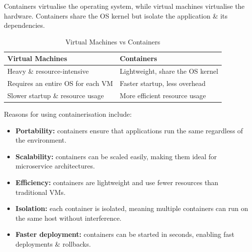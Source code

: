 \documentclass[a4paper,11pt]{article}
\begin{document}
Containers virtualise the operating system, while virtual machines virtualise the hardware.
Containers share the OS kernel but isolate the application \& its dependencies.

\begin{table}[h!]
    \centering

    \begin{tabular}{|>{\arraybackslash}p{}|>{\arraybackslash}p{}|}
        \hline
        \textbf{Virtual Machines}                                           & \textbf{Containers} \\
        \hline
        Heavy \& resource-intensive                                         & Lightweight, share the OS kernel \\
        \hline
        Requires an entire OS for each VM                                   & Faster startup, less overhead \\
        \hline
        Slower startup \& resource usage                                    & More efficient resource usage\\
        \hline
    \end{tabular}
    \caption{Virtual Machines vs Containers}
\end{table}

Reasons for using containerisation include:
\begin{itemize}
    \item   \textbf{Portability:} containers ensure that applications run the same regardless of the environment.
    \item   \textbf{Scalability:} containers can be scaled easily, making them ideal for microservice architectures.
    \item   \textbf{Efficiency:} containers are lightweight and use fewer resources than traditional VMs.
    \item   \textbf{Isolation:} each container is isolated, meaning multiple containers can run on the same host
            without interference.
    \item   \textbf{Faster deployment:} containers can be started in seconds, enabling fast deployments \& rollbacks.
\end{itemize}
\end{document}
